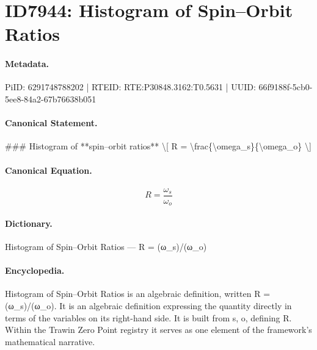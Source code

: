 \section*{ID7944: Histogram of Spin–Orbit Ratios}
\paragraph{Metadata.}
PiID: 6291748788202 | RTEID: RTE:P30848.3162:T0.5631 | UUID: 66f9188f-5cb0-5ee8-84a2-67b76638b051

\paragraph{Canonical Statement.}
\#\#\# Histogram of **spin–orbit ratios** \textbackslash{}[ R = \textbackslash{}frac\{\textbackslash{}omega\_s\}\{\textbackslash{}omega\_o\} \textbackslash{}]

\paragraph{Canonical Equation.}
\[
R = \frac{\omega_s}{\omega_o}
\]

\paragraph{Dictionary.}
Histogram of Spin–Orbit Ratios — R = (ω\_s)/(ω\_o)

\paragraph{Encyclopedia.}
Histogram of Spin–Orbit Ratios is an algebraic definition, written R = (ω\_s)/(ω\_o). It is an algebraic definition expressing the quantity directly in terms of the variables on its right-hand side. It is built from s, o, defining R. Within the Trawin Zero Point registry it serves as one element of the framework's mathematical narrative.
